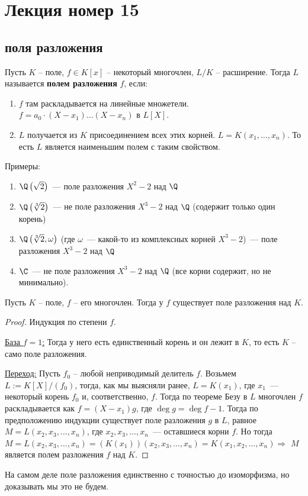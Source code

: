 \section{Лекция номер 15}
\subsection{поля разложения}

\begin{conj}
    Пусть $K$ -- поле, $f \in K[x]$ -- некоторый многочлен, $L/K$ -- расширение. Тогда $L$ называется \textbf{полем разложения} $f$, если:
    \begin{enumerate}
        \item $f$ там раскладывается на линейные множетели. $f = a_0 \cdot (X - x_1) \dots (X - x_n)$ в $L[X]$.
        \item $L$ получается из $K$ присоединением всех этих корней. $L = K(x_1, \dots, x_n)$. То есть $L$ является наименьшим полем с таким свойством. 
    \end{enumerate}
\end{conj}
Примеры:
\begin{enumerate}
    \item $\Q\left(\sqrt 2\right)$~--- поле разложения $X^2-2$ над $\Q$
    \item $\Q\left(\sqrt[3]{2}\right)$~--- не поле разложения $X^3-2$ над $\Q$ (содержит только один корень)
    \item $\Q\left(\sqrt[3]{2}, \omega\right)$ (где $\omega$~--- какой-то из комплексных корней $X^3-2$)~--- поле разложения $X^3-2$ над $\Q$
    \item $\C$~--- не поле разложения $X^3-2$ над $\Q$ (все корни содержит, но не минимально).
\end{enumerate}

\begin{theorem}
    Пусть $K$ -- поле, $f$ -- его многочлен. Тогда у $f$ существует поле разложения над $K$. 
\end{theorem}
\begin{proof}
    Индукция по степени $f$. 

    \quad \underline{База $f = 1$:} Тогда у него есть единственный корень и он лежит в $K$, то есть $K$ -- само поле разложения. 

    \quad \underline{Переход:} Пусть $f_0$ -- любой неприводимый делитель $f$.
    Возьмем $L := K[X] / (f_0)$, тогда, как мы выясняли ранее, $L=K(x_1)$, где $x_1$~--- некоторый корень $f_0$ и, соответственно, $f$.
    Тогда по теореме Безу в $L$ многочлен $f$ раскладывается как $f=(X-x_1)g$, где $\deg g = \deg f - 1$.
    Тогда по предположению индукции существует поле разложения $g$ в $L$, равное $M=L(x_2, x_3, \ldots, x_n)$, где $x_2,x_3,\ldots, x_n$~--- оставшиеся корни $f$.
    Но тогда $M=L(x_2, x_3, \ldots, x_n) = (K(x_1))(x_2, x_3, \ldots, x_n) = K(x_1, x_2, \ldots, x_n) \Rightarrow$ $M$ является полем разложения $f$ над $K$.
\end{proof}
\notice На самом деле поле разложения единственно с точностью до изоморфизма, но доказывать мы это не будем.

